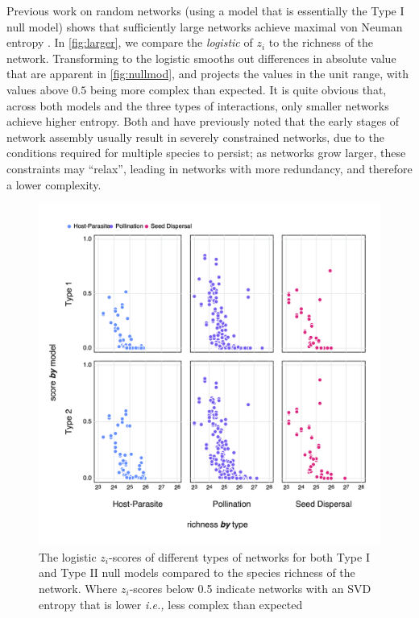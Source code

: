 Previous work on random networks (using a model that is essentially the Type I
null model) shows that sufficiently large networks achieve maximal von Neuman
entropy \cite{Du2010NotNeu, Passerini2011NeuEnt}. In \autoref{fig:larger}, we compare the
\emph{logistic} of \(z_i\) to the richness of the network. Transforming to the
logistic smooths out differences in absolute value that are apparent in
\autoref{fig:nullmod}, and projects the values in the unit range, with values
above \(0.5\) being more complex than expected. It is quite obvious that, across
both models and the three types of interactions, only smaller networks achieve
higher entropy. Both \cite{Barbier2018GenAss} and \cite{Saravia2018EcoNet} have previously noted that the early stages of
network assembly usually result in severely constrained networks, due to the
conditions required for multiple species to persist; as networks grow larger,
these constraints may ``relax'', leading in networks with more redundancy, and
therefore a lower complexity.

\begin{figure}[h]
    \centering
    \includegraphics[width=\textwidth]{figures/nullmodel_richness.png}
    \caption{The logistic \(z_i\)-scores of different types of networks for both
Type I and Type II null models compared to the species richness of the network.
Where \(z_i\)-scores below 0.5 indicate networks with an SVD entropy that is
lower \emph{i.e.,} less complex than expected}
    \label{fig:larger}
\end{figure}

